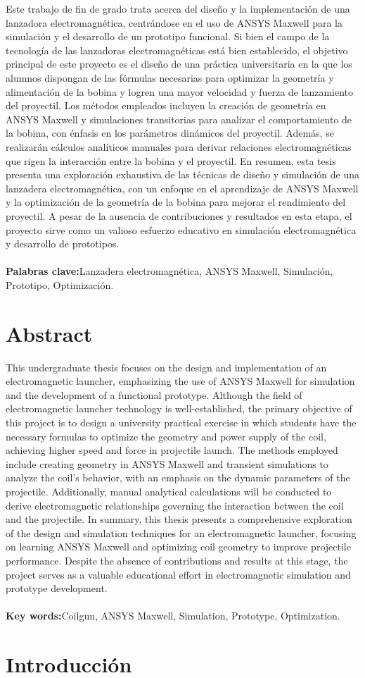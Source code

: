 \documentclass[a4paper,12pt]{article}
\begin{document}
Este trabajo de fin de grado trata acerca del diseño y la implementación de una lanzadora electromagnética, centrándose en el uso de ANSYS Maxwell para la simulación y el desarrollo de un prototipo funcional. Si bien el campo de la tecnología de las lanzadoras electromagnéticas está bien establecido, el objetivo principal de este proyecto es el diseño de una práctica universitaria en la que los alumnos dispongan de las fórmulas necesarias para optimizar la geometría y alimentación de la bobina y logren una mayor velocidad y fuerza de lanzamiento del proyectil. Los métodos empleados incluyen la creación de geometría en ANSYS Maxwell y simulaciones transitorias para analizar el comportamiento de la bobina, con énfasis en los parámetros dinámicos del proyectil. Además, se realizarán cálculos analíticos manuales para derivar relaciones electromagnéticas que rigen la interacción entre la bobina y el proyectil. En resumen, esta tesis presenta una exploración exhaustiva de las técnicas de diseño y simulación de una lanzadera electromagnética, con un enfoque en el aprendizaje de ANSYS Maxwell y la optimización de la geometría de la bobina para mejorar el rendimiento del proyectil. A pesar de la ausencia de contribuciones y resultados en esta etapa, el proyecto sirve como un valioso esfuerzo educativo en simulación electromagnética y desarrollo de prototipos.
\\~\\
\textbf{Palabras clave:}Lanzadera electromagnética, ANSYS Maxwell, Simulación, Prototipo, Optimización.

\newpage
\thispagestyle{plain}
\section{Abstract}
This undergraduate thesis focuses on the design and implementation of an electromagnetic launcher, emphasizing the use of ANSYS Maxwell for simulation and the development of a functional prototype. Although the field of electromagnetic launcher technology is well-established, the primary objective of this project is to design a university practical exercise in which students have the necessary formulas to optimize the geometry and power supply of the coil, achieving higher speed and force in projectile launch. The methods employed include creating geometry in ANSYS Maxwell and transient simulations to analyze the coil's behavior, with an emphasis on the dynamic parameters of the projectile. Additionally, manual analytical calculations will be conducted to derive electromagnetic relationships governing the interaction between the coil and the projectile. In summary, this thesis presents a comprehensive exploration of the design and simulation techniques for an electromagnetic launcher, focusing on learning ANSYS Maxwell and optimizing coil geometry to improve projectile performance. Despite the absence of contributions and results at this stage, the project serves as a valuable educational effort in electromagnetic simulation and prototype development.
\\~\\
\textbf{Key words:}Coilgun, ANSYS Maxwell, Simulation, Prototype, Optimization.

\newpage
\thispagestyle{plain}
\section{Introducción}
\end{document}
